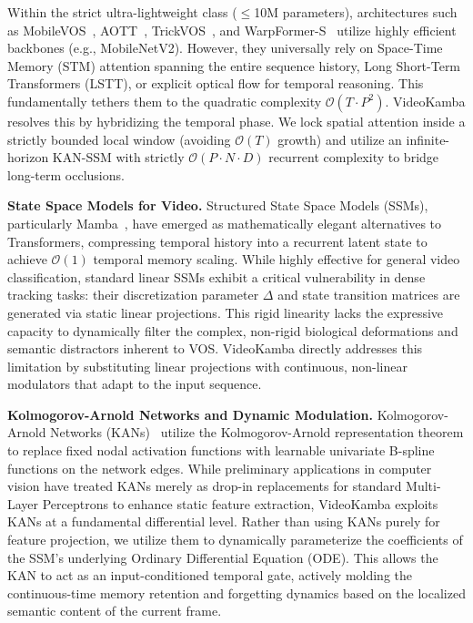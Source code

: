 \documentclass[sigconf]{acmart}
\begin{document}
Within the strict ultra-lightweight class ($\leq$10M parameters), architectures such as MobileVOS~\cite{miles2023mobilevos}, AOTT~\cite{yang2021aost}, TrickVOS~\cite{skartados2023trickvos}, and WarpFormer-S~\cite{fedynyak2023global} utilize highly efficient backbones (e.g., MobileNetV2). However, they universally rely on Space-Time Memory (STM) attention spanning the entire sequence history, Long Short-Term Transformers (LSTT), or explicit optical flow for temporal reasoning. This fundamentally tethers them to the quadratic complexity $\mathcal{O}(T \cdot P^2)$. VideoKamba resolves this by hybridizing the temporal phase. We lock spatial attention inside a strictly bounded local window (avoiding $\mathcal{O}(T)$ growth) and utilize an infinite-horizon KAN-SSM with strictly $\mathcal{O}(P \cdot N \cdot D)$ recurrent complexity to bridge long-term occlusions.

\textbf{State Space Models for Video.} 
Structured State Space Models (SSMs), particularly Mamba~\cite{gu2024mamba}, have emerged as mathematically elegant alternatives to Transformers, compressing temporal history into a recurrent latent state to achieve $\mathcal{O}(1)$ temporal memory scaling. While highly effective for general video classification, standard linear SSMs exhibit a critical vulnerability in dense tracking tasks: their discretization parameter $\Delta$ and state transition matrices are generated via static linear projections. This rigid linearity lacks the expressive capacity to dynamically filter the complex, non-rigid biological deformations and semantic distractors inherent to VOS. VideoKamba directly addresses this limitation by substituting linear projections with continuous, non-linear modulators that adapt to the input sequence.

\textbf{Kolmogorov-Arnold Networks and Dynamic Modulation.} 
Kolmogorov-Arnold Networks (KANs)~\cite{liu2024kan} utilize the Kolmogorov-Arnold representation theorem to replace fixed nodal activation functions with learnable univariate B-spline functions on the network edges. While preliminary applications in computer vision have treated KANs merely as drop-in replacements for standard Multi-Layer Perceptrons to enhance static feature extraction, VideoKamba exploits KANs at a fundamental differential level. Rather than using KANs purely for feature projection, we utilize them to dynamically parameterize the coefficients of the SSM's underlying Ordinary Differential Equation (ODE). This allows the KAN to act as an input-conditioned temporal gate, actively molding the continuous-time memory retention and forgetting dynamics based on the localized semantic content of the current frame.
\end{document}
